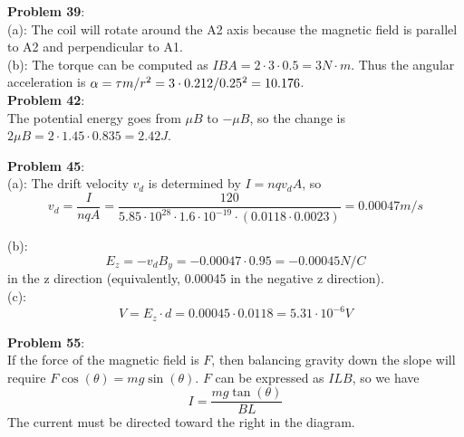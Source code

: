 \documentclass{amsart}
\begin{document}
	\textbf{Problem 39}:\\
	
	(a): The coil will rotate around the A2 axis because the magnetic field is parallel to A2 and perpendicular to A1.\\
	
	(b): The torque can be computed as $IBA = 2 \cdot 3 \cdot 0.5 = 3 N\cdot m$. Thus the angular acceleration is $\alpha = \tau m / r^2 = 3 \cdot 0.212 / 0.25^2 = 10.176$.\\
	
	\textbf{Problem 42}:\\
	
	The potential energy goes from $\mu B$ to $-\mu B$, so the change is $2\mu B = 2\cdot 1.45 \cdot 0.835 = 2.42 J$.
	
	\textbf{Problem 45}:\\
	
	(a): The drift velocity $v_d$ is determined by $I = n q v_d A$, so 
	$$
	v_d = \frac{I}{nq A} = \frac{120}{5.85 \cdot 10^{28} \cdot 1.6\cdot 10^{-19} \cdot (0.0118 \cdot 0.0023)} = 0.00047 m/s
	$$
	
	(b): 
	$$ E_z = -v_d B_y = -0.00047 \cdot 0.95 = -0.00045 N/C$$
	in the z direction (equivalently, 0.00045 in the negative z direction).\\
	
	(c):
	$$
	V = E_z \cdot d = 0.00045 \cdot 0.0118 = 5.31 \cdot 10^{-6} V
	$$
	
	\textbf{Problem 55}:\\
	
	If the force of the magnetic field is $F$, then balancing gravity down the slope will require $F\cos(\theta) = mg\sin(\theta)$. $F$ can be expressed as $ILB$, so we have
	$$
	I = \frac{mg \tan(\theta)}{BL}
	$$
	The current must be directed toward the right in the diagram.
\end{document}
